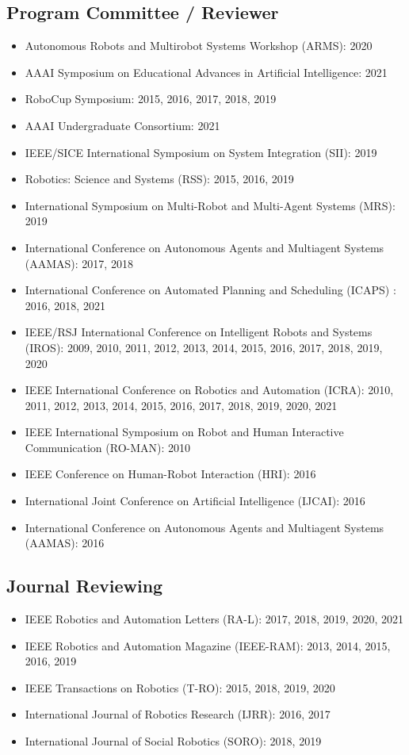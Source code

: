 \documentclass[Times]{article}
\begin{document}
\subsection*{Program Committee / Reviewer}
\begin{itemize}
 \item Autonomous Robots and Multirobot Systems Workshop (ARMS): 2020
 \item AAAI Symposium on Educational Advances in Artificial Intelligence: 2021
 \item RoboCup Symposium: 2015, 2016, 2017, 2018, 2019
 \item AAAI Undergraduate Consortium: 2021
 \item IEEE/SICE International Symposium on System Integration (SII): 2019
 \item Robotics: Science and Systems (RSS): 2015, 2016, 2019
 \item International Symposium on Multi-Robot and Multi-Agent Systems (MRS): 2019
 \item International Conference on Autonomous Agents and Multiagent Systems
(AAMAS): 2017, 2018
\item International Conference on Automated Planning and Scheduling (ICAPS)
 : 2016, 2018, 2021
 \item IEEE/RSJ International Conference on Intelligent Robots and Systems
(IROS): 2009, 2010, 2011, 2012, 2013, 2014, 2015, 2016, 2017, 2018, 2019, 2020
\item IEEE International Conference on Robotics and Automation (ICRA): 2010,
  2011, 2012, 2013, 2014, 2015, 2016, 2017, 2018, 2019, 2020, 2021
\item IEEE International Symposium on Robot and Human Interactive Communication
  (RO-MAN): 2010
 \item IEEE Conference on Human-Robot Interaction (HRI): 2016
 \item International Joint Conference on Artificial Intelligence (IJCAI): 2016
 \item International Conference on Autonomous Agents and Multiagent Systems
(AAMAS): 2016
\end{itemize}

\subsection*{Journal Reviewing}
\begin{itemize}
  \item IEEE Robotics and Automation Letters (RA-L): 2017, 2018, 2019, 2020, 2021
\item IEEE Robotics and Automation Magazine (IEEE-RAM): 2013, 2014, 2015, 2016, 2019
  \item IEEE Transactions on Robotics (T-RO): 2015, 2018, 2019, 2020
  \item International Journal of Robotics Research (IJRR): 2016, 2017
  \item International Journal of Social Robotics (SORO): 2018, 2019
\end{itemize}
\end{document}
